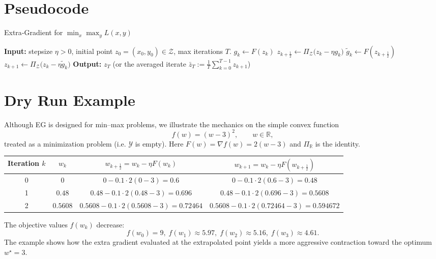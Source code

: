 \documentclass{article}
\begin{document}
\section*{Pseudocode}
\begin{algorithm}[H]
\caption{Extra‑Gradient for $\min_{x}\max_{y}L(x,y)$}
\begin{algorithmic}[1]
\State \textbf{Input:} stepsize $\eta>0$, initial point $z_{0}=(x_{0},y_{0})\in\mathcal{Z}$, max iterations $T$.
    \State $g_{k}\gets F(z_{k})$                                 
    \State $z_{k+\frac12}\gets \Pi_{\mathcal{Z}}\!\bigl(z_{k}-\eta g_{k}\bigr)$ 
    \State $\tilde g_{k}\gets F(z_{k+\frac12})$                 
    \State $z_{k+1}\gets \Pi_{\mathcal{Z}}\!\bigl(z_{k}-\eta\tilde g_{k}\bigr)$ 
\EndFor
\State \textbf{Output:} $z_{T}$ (or the averaged iterate $\bar z_{T}:=\tfrac1T\sum_{k=0}^{T-1}z_{k+1}$)
\end{algorithmic}
\end{algorithm}

\section*{Dry Run Example}
Although EG is designed for min–max problems, we illustrate the mechanics on the simple convex function 
\[
f(w)=(w-3)^{2}, \qquad w\in\mathbb{R},
\]
treated as a minimization problem (i.e. $\mathcal{Y}$ is empty).  
Here $F(w)=\nabla f(w)=2(w-3)$ and $\Pi_{\mathbb{R}}$ is the identity.

\begin{center}
\begin{tabular}{c|c|c|c}
Iteration $k$ & $w_{k}$ & $w_{k+\frac12}=w_{k}-\eta F(w_{k})$ & $w_{k+1}=w_{k}-\eta F(w_{k+\frac12})$\\\hline
0 & $0$ & $0-0.1\cdot 2(0-3)=0.6$ & $0-0.1\cdot 2(0.6-3)=0.48$\\
1 & $0.48$ & $0.48-0.1\cdot 2(0.48-3)=0.696$ & $0.48-0.1\cdot 2(0.696-3)=0.5608$\\
2 & $0.5608$ & $0.5608-0.1\cdot 2(0.5608-3)=0.72464$ & $0.5608-0.1\cdot 2(0.72464-3)=0.594672$\\
\end{tabular}
\end{center}
The objective values $f(w_{k})$ decrease:
\[
f(w_{0})=9,\; f(w_{1})\approx 5.97,\; f(w_{2})\approx 5.16,\; f(w_{3})\approx 4.61.
\]
The example shows how the extra gradient evaluated at the extrapolated point yields a more aggressive contraction toward the optimum $w^{\star}=3$.
\end{document}
